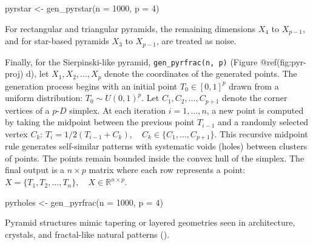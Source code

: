 \documentclass[
  11pt,
  a4paper,
]{report}
\newenvironment{Shaded}{\begin{snugshade}}{\end{snugshade}}
\newcommand{\AttributeTok}[1]{\textcolor[rgb]{0.40,0.45,0.13}{#1}}
\newcommand{\DecValTok}[1]{\textcolor[rgb]{0.68,0.00,0.00}{#1}}
\newcommand{\FunctionTok}[1]{\textcolor[rgb]{0.28,0.35,0.67}{#1}}
\newcommand{\NormalTok}[1]{\textcolor[rgb]{0.00,0.23,0.31}{#1}}
\newcommand{\OtherTok}[1]{\textcolor[rgb]{0.00,0.23,0.31}{#1}}
\begin{document}
\begin{Shaded}
\begin{Highlighting}[]
\NormalTok{pyrstar }\OtherTok{\textless{}{-}} \FunctionTok{gen\_pyrstar}\NormalTok{(}\AttributeTok{n =} \DecValTok{1000}\NormalTok{, }\AttributeTok{p =} \DecValTok{4}\NormalTok{)}
\end{Highlighting}
\end{Shaded}

For rectangular and triangular pyramids, the remaining dimensions
\(X_4\) to \(X_{p-1}\), and for star-based pyramids \(X_3\) to
\(X_{p-1}\), are treated as noise.

Finally, for the Sierpinski-like pyramid, \texttt{gen\_pyrfrac(n,\ p)}
(Figure @ref(fig:pyr-proj) d), let \(X_1, X_2, \dots, X_p\) denote the
coordinates of the generated points. The generation process begins with
an initial point \(T_0 \in [0, 1]^p\) drawn from a uniform distribution:
\(T_0 \sim U(0, 1)^p\). Let \(C_1, C_2, \dots, C_{p+1}\) denote the
corner vertices of a \(p\text{-}D\) simplex. At each iteration
\(i = 1, \dots, n\), a new point is computed by taking the midpoint
between the previous point \(T_{i-1}\) and a randomly selected vertex
\(C_k\):
\(T_i = 1/2(T_{i-1} + C_k), \quad C_k \in \{C_1, \dots, C_{p+1}\}\).
This recursive midpoint rule generates self-similar patterns with
systematic voids (holes) between clusters of points. The points remain
bounded inside the convex hull of the simplex. The final output is a
\(n \times p\) matrix where each row represents a point:
\(X = \{T_1, T_2, \dots, T_n\}, \quad X \in \mathbb{R}^{n \times p}\).

\begin{Shaded}
\begin{Highlighting}[]
\NormalTok{pyrholes }\OtherTok{\textless{}{-}} \FunctionTok{gen\_pyrfrac}\NormalTok{(}\AttributeTok{n =} \DecValTok{1000}\NormalTok{, }\AttributeTok{p =} \DecValTok{4}\NormalTok{)}
\end{Highlighting}
\end{Shaded}

Pyramid structures mimic tapering or layered geometries seen in
architecture, crystals, and fractal-like natural patterns
().
\end{document}

